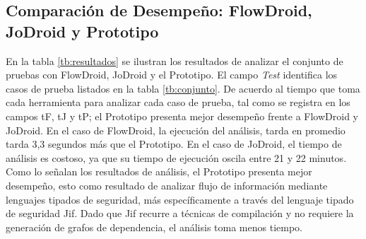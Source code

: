 \subsection{Comparación de Desempeño: FlowDroid, JoDroid y Prototipo}
En la tabla \ref{tb:resultados} se ilustran los resultados de analizar el
conjunto de pruebas con FlowDroid, JoDroid y el Prototipo. El campo \emph{Test}
identifica los casos de prueba listados en la tabla \ref{tb:conjunto}.
De acuerdo al tiempo que toma cada herramienta para analizar cada caso de
prueba, tal como se registra en los campos tF, tJ y tP; el Prototipo presenta
mejor desempeño frente a FlowDroid y JoDroid. En el caso de FlowDroid, la
ejecución del análisis, tarda en promedio tarda 3,3 segundos más que el
Prototipo. En el caso de JoDroid, el tiempo de análisis es costoso, ya que su tiempo de
ejecución oscila entre 21 y 22 minutos.\newline
Como lo señalan los resultados de análisis, el Prototipo presenta mejor
desempeño, esto como resultado de analizar flujo de información mediante
lenguajes tipados de seguridad, más específicamente a través del lenguaje tipado
de seguridad Jif.
Dado que Jif recurre a técnicas de compilación y no requiere la generación de
grafos de dependencia, el análisis toma menos tiempo.
